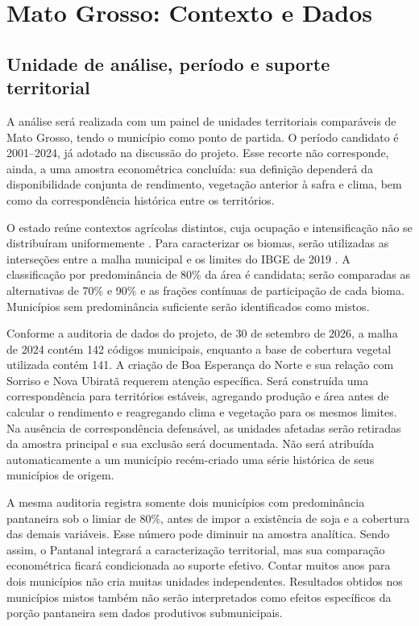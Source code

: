 \section{Mato Grosso: Contexto e Dados}

\subsection{Unidade de análise, período e suporte territorial}

A análise será realizada com um painel de unidades territoriais comparáveis de Mato Grosso, tendo o município como ponto de partida. O período candidato é 2001--2024, já adotado na discussão do projeto. Esse recorte não corresponde, ainda, a uma amostra econométrica concluída: sua definição dependerá da disponibilidade conjunta de rendimento, vegetação anterior à safra e clima, bem como da correspondência histórica entre os territórios.

O estado reúne contextos agrícolas distintos, cuja ocupação e intensificação não se distribuíram uniformemente \cite{VanWeyEtAl2013,SimoesEtAl2020}. Para caracterizar os biomas, serão utilizadas as interseções entre a malha municipal e os limites do IBGE de 2019 \cite{IBGEBiomas2019}. A classificação por predominância de 80\% da área é candidata; serão comparadas as alternativas de 70\% e 90\% e as frações contínuas de participação de cada bioma. Municípios sem predominância suficiente serão identificados como mistos.

Conforme a auditoria de dados do projeto, de 30 de setembro de 2026, a malha de 2024 contém 142 códigos municipais, enquanto a base de cobertura vegetal utilizada contém 141. A criação de Boa Esperança do Norte e sua relação com Sorriso e Nova Ubiratã requerem atenção específica. Será construída uma correspondência para territórios estáveis, agregando produção e área antes de calcular o rendimento e reagregando clima e vegetação para os mesmos limites. Na ausência de correspondência defensável, as unidades afetadas serão retiradas da amostra principal e sua exclusão será documentada. Não será atribuída automaticamente a um município recém-criado uma série histórica de seus municípios de origem.

A mesma auditoria registra somente dois municípios com predominância pantaneira sob o limiar de 80\%, antes de impor a existência de soja e a cobertura das demais variáveis. Esse número pode diminuir na amostra analítica. Sendo assim, o Pantanal integrará a caracterização territorial, mas sua comparação econométrica ficará condicionada ao suporte efetivo. Contar muitos anos para dois municípios não cria muitas unidades independentes. Resultados obtidos nos municípios mistos também não serão interpretados como efeitos específicos da porção pantaneira sem dados produtivos submunicipais.

